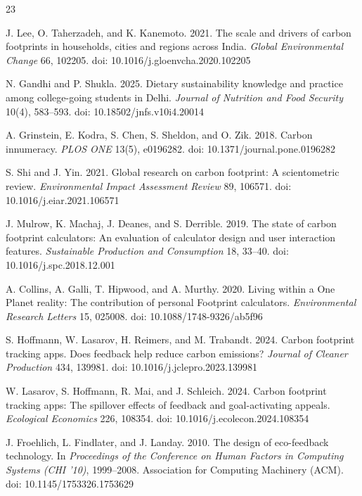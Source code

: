 \documentclass[12pt, a4paper]{article}
\begin{document}
\begin{thebibliography}{23}
\footnotesize

J. Lee, O. Taherzadeh, and K. Kanemoto. 2021. The scale and drivers of carbon footprints in households, cities and regions across India. \textit{Global Environmental Change} 66, 102205. doi: 10.1016/j.gloenvcha.2020.102205

N. Gandhi and P. Shukla. 2025. Dietary sustainability knowledge and practice among college-going students in Delhi. \textit{Journal of Nutrition and Food Security} 10(4), 583--593. doi: 10.18502/jnfs.v10i4.20014

A. Grinstein, E. Kodra, S. Chen, S. Sheldon, and O. Zik. 2018. Carbon innumeracy. \textit{PLOS ONE} 13(5), e0196282. doi: 10.1371/journal.pone.0196282

S. Shi and J. Yin. 2021. Global research on carbon footprint: A scientometric review. \textit{Environmental Impact Assessment Review} 89, 106571. doi: 10.1016/j.eiar.2021.106571

J. Mulrow, K. Machaj, J. Deanes, and S. Derrible. 2019. The state of carbon footprint calculators: An evaluation of calculator design and user interaction features. \textit{Sustainable Production and Consumption} 18, 33--40. doi: 10.1016/j.spc.2018.12.001

A. Collins, A. Galli, T. Hipwood, and A. Murthy. 2020. Living within a One Planet reality: The contribution of personal Footprint calculators. \textit{Environmental Research Letters} 15, 025008. doi: 10.1088/1748-9326/ab5f96

S. Hoffmann, W. Lasarov, H. Reimers, and M. Trabandt. 2024. Carbon footprint tracking apps. Does feedback help reduce carbon emissions? \textit{Journal of Cleaner Production} 434, 139981. doi: 10.1016/j.jclepro.2023.139981

W. Lasarov, S. Hoffmann, R. Mai, and J. Schleich. 2024. Carbon footprint tracking apps: The spillover effects of feedback and goal-activating appeals. \textit{Ecological Economics} 226, 108354. doi: 10.1016/j.ecolecon.2024.108354

J. Froehlich, L. Findlater, and J. Landay. 2010. The design of eco-feedback technology. In \textit{Proceedings of the Conference on Human Factors in Computing Systems (CHI '10)}, 1999--2008. Association for Computing Machinery (ACM). doi: 10.1145/1753326.1753629


\end{thebibliography}
\end{document}
